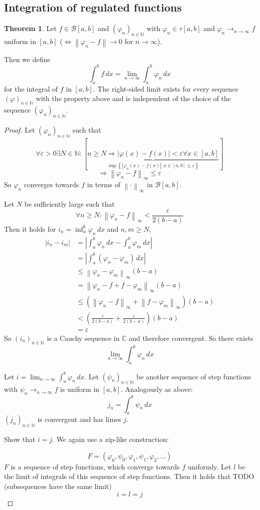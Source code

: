 \documentclass[a4paper,landscape,twocolumn]{article}
\theoremstyle{definition}
\newtheorem{theorem}{Theorem}
\newcommand\set[1]{\left\{#1\right\}}
\newcommand\abs[1]{\left|#1\right|}
\newcommand\seq[1]{{\left(#1\right)}_{n \in \mathbb N}}
\newcommand\reg{\mathcal B}
\newcommand\norm[1]{\left\|#1\right\|}
\begin{document}
\subsection{Integration of regulated functions}
%
\begin{theorem}
  Let $f \in \reg[a,b]$ and $\seq{\varphi_n}$ with $\varphi_n \in \tau[a,b]$ and $\varphi_n \to_{n\to\infty} f$
  uniform in $[a,b]$ ($\Leftrightarrow \norm{\varphi_n - f} \to 0$ for $n \to \infty$).

  Then we define
  \[ \int_a^b f\, dx = \lim_{n\to\infty} \int_a^b \varphi_n \, dx \]
  for the integral of $f$ in $[a,b]$.
  The right-sided limit exists for every sequence $\seq{\varphi}$ with the property above
  and is independent of the choice of the sequence $\seq{\varphi_n}$.
\end{theorem}
\begin{proof}
  Let $\seq{\varphi_n}$ such that
  \[
    \forall \varepsilon > 0 \exists N \in \mathbb N:
    [\underbrace{n \geq N \Rightarrow \abs{\varphi(x) - f(x)} < \varepsilon \forall x \in [a,b]}_{\sup\set{\abs{\varphi_n(x) - f(x)}: x \in [a,b] \leq \varepsilon}}]
  \] \[
    \Rightarrow \norm{\varphi_n - f}_\infty \leq \varepsilon
  \]
  So $\varphi_n$ converges towards $f$ in terms of $\norm{\cdot}_\infty$ in $\reg[a,b]$.

  Let $N$ be sufficiently large such that
  \[ \forall n \geq N: \norm{\varphi_n - f}_\infty < \frac\varepsilon{2(b-a)} \]
  Then it holds for $i_n = \inf_a^b \varphi_n \, dx$ and $n,m \geq N$,
  \begin{align*}
    \abs{i_n - i_m}
      &= \abs{\int_a^b \varphi_n\,dx - \int_a^b \varphi_m\,dx} \\
      &= \abs{\int_a^b (\varphi_n - \varphi_m) \, dx} \\
      &\leq \norm{\varphi_n - \varphi_m}_\infty (b-a) \\
      &= \norm{\varphi_n - f + f - \varphi_m}_\infty (b-a) \\
      &\leq (\norm{\varphi_n - f}_\infty + \norm{f - \varphi_m}_\infty) (b - a) \\
      &< \left(\frac{\varepsilon}{2(b-a)} + \frac{\varepsilon}{2(b - a)}\right)(b - a) \\
      &= \varepsilon
  \end{align*}
  So $\seq{i_n}$ is a Cauchy sequence in $\mathbb C$ and therefore convergent.
  So there exists
  \[ \lim_{n\to\infty} \int_a^b \varphi_n \, dx \]

  Let $i = \lim_{n\to\infty} \int_a^b \varphi_n \, dx$.
  Let $\seq{\psi_n}$ be another sequence of step functions with
  $\psi_n \to_{n\to\infty} f$ is uniform in $[a,b]$.
  Analogously as above:
  \[ j_n = \int_a^b \psi_n \, dx \]
  $\seq{j_n}$ is convergent and has limes $j$.

  Show that $i = j$. We again use a zip-like construction:

  \[ F = (\varphi_0, \psi_0, \varphi_1, \psi_1, \varphi_2, \ldots) \]
  $F$ is a sequence of step functions, which converge towards $f$ uniformly.
  Let $l$ be the limit of integrals of this sequence of step functions.
  Then it holds that TODO (subsequences have the same limit)
  \[ i = l = j \]
\end{proof}
\end{document}
